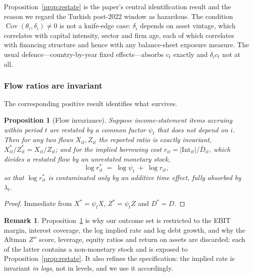 \documentclass[review,12pt,authoryear]{elsarticle}
\theoremstyle{plain}
\newtheorem{proposition}{Proposition}
\theoremstyle{definition}
\newtheorem{remark}{Remark}
\newcommand{\Cov}{\operatorname{Cov}}
\begin{document}
Proposition~\ref{prop:restate} is the paper's central identification result and
the reason we regard the Turkish post-2022 window as hazardous. The condition
$\Cov(\theta_i,\delta_i)\neq0$ is not a knife-edge case: $\delta_i$ depends on
asset vintage, which correlates with capital intensity, sector and firm age,
each of which correlates with financing structure and hence with any
balance-sheet exposure measure. The usual defence---country-by-year fixed
effects---absorbs $c_t$ exactly and $\delta_ic_t$ not at all.

\subsubsection{Flow ratios are invariant}

The corresponding positive result identifies what survives.

\begin{proposition}[Flow invariance]
\label{prop:flow}
Suppose income-statement items accruing within period $t$ are restated by a
common factor $\psi_t$ that does not depend on $i$. Then for any two flows
$X_{it},Z_{it}$ the reported ratio is exactly invariant,
$X^{*}_{it}/Z^{*}_{it}=X_{it}/Z_{it}$; and for the implied borrowing cost
$r_{it}=|\mathrm{Int}_{it}|/\bar{D}_{it}$, which divides a restated flow by an
unrestated monetary stock,
\begin{equation}
\log r^{*}_{it} \;=\; \log\psi_t \;+\; \log r_{it},
\end{equation}
so that $\log r^{*}_{it}$ is contaminated only by an additive time effect, fully
absorbed by $\lambda_t$.
\end{proposition}

\begin{proof}
Immediate from $X^{*}=\psi_tX$, $Z^{*}=\psi_tZ$ and $D^{*}=D$. \end{proof}

\begin{remark}
Proposition~\ref{prop:flow} is why our outcome set is restricted to the EBIT
margin, interest coverage, the log implied rate and log debt growth, and why the
Altman $Z''$ score, leverage, equity ratios and return on assets are discarded:
each of the latter contains a non-monetary stock and is exposed to
Proposition~\ref{prop:restate}. It also refines the specification: the implied
rate is invariant \emph{in logs}, not in levels, and we use it accordingly.
\end{remark}
\end{document}

